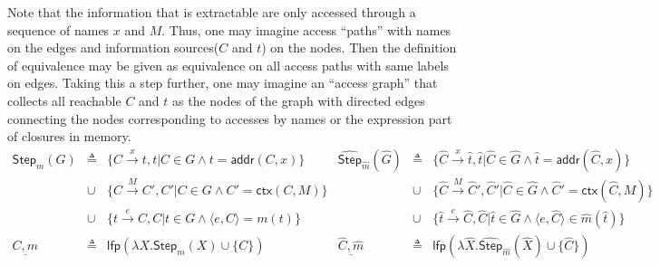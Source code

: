 \documentclass{article}
\theoremstyle{definition}
\newcommand*{\A}[1]{\widehat{#1}}
\newcommand*{\addr}{\mathsf{addr}}
\newcommand*{\modctx}{\mathsf{ctx}}
\begin{document}
Note that the information that is extractable are only accessed through a sequence of names $x$ and $M$.
Thus, one may imagine access ``paths'' with names on the edges and information sources($C$ and $t$) on the nodes.
Then the definition of equivalence may be given as equivalence on all access paths with same labels on edges.
Taking this a step further, one may imagine an ``access graph'' that collects all reachable $C$ and $t$ as the nodes of the graph with directed edges connecting the nodes corresponding to accesses by names or the expression part of closures in memory.
\[
  \begin{array}{rclrcl}
    \mathsf{Step}_m(G) & \triangleq & \{C\xrightarrow{x}t,t|C\in G\wedge t=\addr(C,x)\}             & \A{\mathsf{Step}}_{\A{m}}(\A{G}) & \triangleq & \{\A{C}\xrightarrow{x}\A{t},\A{t}|\A{C}\in \A{G}\wedge \A{t}=\addr(\A{C},x)\}                   \\
                       & \cup       & \{C\xrightarrow{M}C',C'|C\in G\wedge C'=\modctx(C,M)\}        &                                  & \cup       & \{\A{C}\xrightarrow{M}\A{C}',\A{C}'|\A{C}\in \A{G}\wedge \A{C}'=\modctx(\A{C},M)\}              \\
                       & \cup       & \{t\xrightarrow{e}C,C|t\in G\wedge \langle e,C \rangle=m(t)\} &                                  & \cup       & \{\A{t}\xrightarrow{e}\A{C},\A{C}|\A{t}\in \A{G}\wedge \langle e,\A{C} \rangle\in\A{m}(\A{t})\} \\
    \underline{C,m}    & \triangleq & \mathsf{lfp}(\lambda X.\mathsf{Step}_m(X)\cup\{C\})           & \underline{\A{C},\A{m}}          & \triangleq & \mathsf{lfp}(\lambda \A{X}.\A{\mathsf{Step}}_{\A{m}}(\A{X})\cup\{\A{C}\})
  \end{array}
\]
\end{document}
